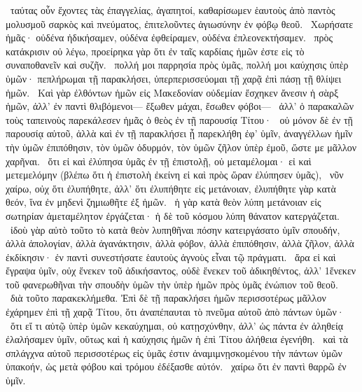~ταύτας οὖν ἔχοντες τὰς ἐπαγγελίας, ἀγαπητοί, καθαρίσωμεν ἑαυτοὺς ἀπὸ παντὸς μολυσμοῦ σαρκὸς καὶ πνεύματος, ἐπιτελοῦντες ἁγιωσύνην ἐν φόβῳ θεοῦ.
~Χωρήσατε ἡμᾶς· οὐδένα ἠδικήσαμεν, οὐδένα ἐφθείραμεν, οὐδένα ἐπλεονεκτήσαμεν.
~πρὸς κατάκρισιν οὐ λέγω, προείρηκα γὰρ ὅτι ἐν ταῖς καρδίαις ἡμῶν ἐστε εἰς τὸ συναποθανεῖν καὶ συζῆν.
~πολλή μοι παρρησία πρὸς ὑμᾶς, πολλή μοι καύχησις ὑπὲρ ὑμῶν· πεπλήρωμαι τῇ παρακλήσει, ὑπερπερισσεύομαι τῇ χαρᾷ ἐπὶ πάσῃ τῇ θλίψει ἡμῶν.
~Καὶ γὰρ ἐλθόντων ἡμῶν εἰς Μακεδονίαν οὐδεμίαν ἔσχηκεν ἄνεσιν ἡ σὰρξ ἡμῶν, ἀλλ’ ἐν παντὶ θλιβόμενοι— ἔξωθεν μάχαι, ἔσωθεν φόβοι—
~ἀλλ’ ὁ παρακαλῶν τοὺς ταπεινοὺς παρεκάλεσεν ἡμᾶς ὁ θεὸς ἐν τῇ παρουσίᾳ Τίτου·
~οὐ μόνον δὲ ἐν τῇ παρουσίᾳ αὐτοῦ, ἀλλὰ καὶ ἐν τῇ παρακλήσει ᾗ παρεκλήθη ἐφ’ ὑμῖν, ἀναγγέλλων ἡμῖν τὴν ὑμῶν ἐπιπόθησιν, τὸν ὑμῶν ὀδυρμόν, τὸν ὑμῶν ζῆλον ὑπὲρ ἐμοῦ, ὥστε με μᾶλλον χαρῆναι.
~ὅτι εἰ καὶ ἐλύπησα ὑμᾶς ἐν τῇ ἐπιστολῇ, οὐ μεταμέλομαι· εἰ καὶ μετεμελόμην (βλέπω ὅτι ἡ ἐπιστολὴ ἐκείνη εἰ καὶ πρὸς ὥραν ἐλύπησεν ὑμᾶς),
~νῦν χαίρω, οὐχ ὅτι ἐλυπήθητε, ἀλλ’ ὅτι ἐλυπήθητε εἰς μετάνοιαν, ἐλυπήθητε γὰρ κατὰ θεόν, ἵνα ἐν μηδενὶ ζημιωθῆτε ἐξ ἡμῶν.
~ἡ γὰρ κατὰ θεὸν λύπη μετάνοιαν εἰς σωτηρίαν ἀμεταμέλητον ἐργάζεται· ἡ δὲ τοῦ κόσμου λύπη θάνατον κατεργάζεται.
~ἰδοὺ γὰρ αὐτὸ τοῦτο τὸ κατὰ θεὸν λυπηθῆναι πόσην κατειργάσατο ὑμῖν σπουδήν, ἀλλὰ ἀπολογίαν, ἀλλὰ ἀγανάκτησιν, ἀλλὰ φόβον, ἀλλὰ ἐπιπόθησιν, ἀλλὰ ζῆλον, ἀλλὰ ἐκδίκησιν· ἐν παντὶ συνεστήσατε ἑαυτοὺς ἁγνοὺς εἶναι τῷ πράγματι.
~ἄρα εἰ καὶ ἔγραψα ὑμῖν, οὐχ ἕνεκεν τοῦ ἀδικήσαντος, οὐδὲ ἕνεκεν τοῦ ἀδικηθέντος, ἀλλ’ 1ἕνεκεν τοῦ φανερωθῆναι τὴν σπουδὴν ὑμῶν τὴν ὑπὲρ ἡμῶν πρὸς ὑμᾶς ἐνώπιον τοῦ θεοῦ.
~διὰ τοῦτο παρακεκλήμεθα. Ἐπὶ δὲ τῇ παρακλήσει ἡμῶν περισσοτέρως μᾶλλον ἐχάρημεν ἐπὶ τῇ χαρᾷ Τίτου, ὅτι ἀναπέπαυται τὸ πνεῦμα αὐτοῦ ἀπὸ πάντων ὑμῶν·
~ὅτι εἴ τι αὐτῷ ὑπὲρ ὑμῶν κεκαύχημαι, οὐ κατῃσχύνθην, ἀλλ’ ὡς πάντα ἐν ἀληθείᾳ ἐλαλήσαμεν ὑμῖν, οὕτως καὶ ἡ καύχησις ἡμῶν ἡ ἐπὶ Τίτου ἀλήθεια ἐγενήθη.
~καὶ τὰ σπλάγχνα αὐτοῦ περισσοτέρως εἰς ὑμᾶς ἐστιν ἀναμιμνῃσκομένου τὴν πάντων ὑμῶν ὑπακοήν, ὡς μετὰ φόβου καὶ τρόμου ἐδέξασθε αὐτόν.
~χαίρω ὅτι ἐν παντὶ θαρρῶ ἐν ὑμῖν.

